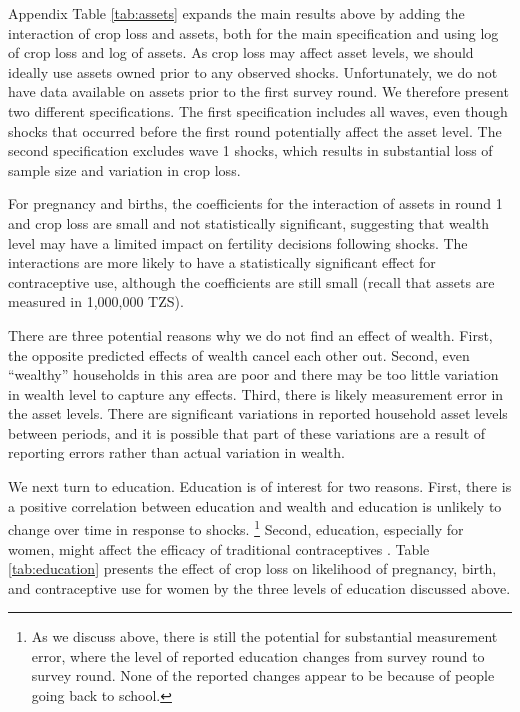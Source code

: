 \documentclass[letterpaper,12pt]{article}
\begin{document}
Appendix Table \ref{tab:assets} expands the main results above by adding 
the interaction of crop loss and assets, both for the main specification
and using log of crop loss and log of assets.
As crop loss may affect asset levels, we should ideally use assets owned 
prior to any observed shocks.
Unfortunately, we do not have data available on assets prior to the first 
survey round.
We therefore present two different specifications.
The first specification includes all waves, even though shocks that 
occurred before the first round potentially affect the asset level.
The second specification excludes wave 1 shocks, which results in
substantial loss of sample size and variation in crop loss.

For pregnancy and births, the coefficients for the interaction of assets 
in round 1 and crop loss are small and not statistically significant,
suggesting that wealth level may have a limited impact on fertility
decisions following shocks. 
The interactions are more likely to have a statistically significant
effect for contraceptive use, although the coefficients are still
small (recall that assets are measured in 1,000,000 TZS).

There are three potential reasons why we do not find an effect of wealth.
First, the opposite predicted effects of wealth cancel each other out.
Second, even ``wealthy'' households in this area are  poor and
there may be too little variation in wealth level to capture any effects.
Third, there is likely measurement error in the asset levels. 
There are significant variations in reported household asset levels between 
periods, and it is possible that part of these variations are a result of 
reporting errors rather than actual variation in wealth.



We next turn to education.
Education is of interest for two reasons.
First, there is a positive correlation between education and wealth and 
education is unlikely to change over time in response to shocks.%
\footnote{
As we discuss above, there is still the potential for substantial
measurement error, where the level of reported education changes
from survey round to survey round.
None of the reported changes appear to be because of people going 
back to school.
}
Second, education, especially for women, might affect the efficacy of 
traditional contraceptives \citep{Rosenzweig1989}.
Table \ref{tab:education} presents the effect of crop loss on
likelihood of pregnancy, birth, and contraceptive use for women
by the three levels of education discussed above.
\end{document}
